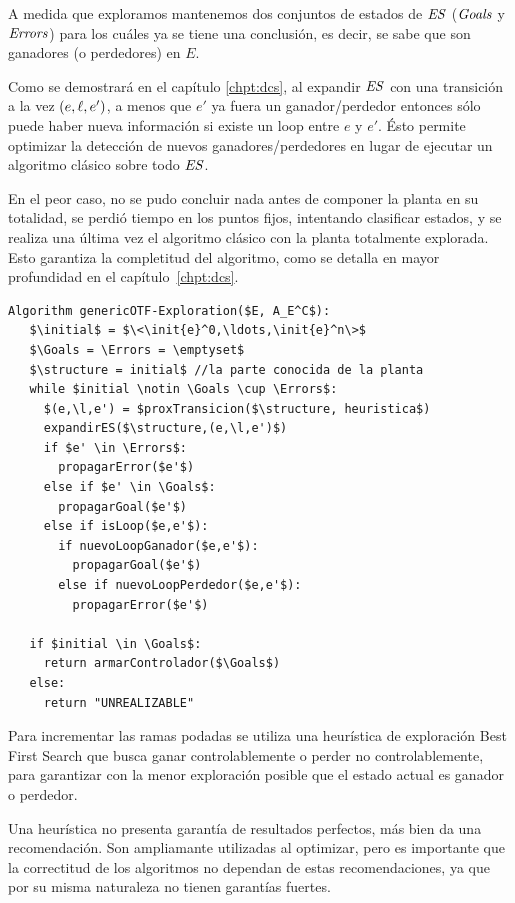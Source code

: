 A medida que exploramos mantenemos dos conjuntos de estados de $\mathit{ES}$ ($\mathit{Goals}$ y $\mathit{Errors}$) para los cuáles ya se tiene una conclusión, es decir, se sabe que son ganadores (o perdedores) en $E$.

Como se demostrará en el capítulo \ref{chpt:dcs}, al expandir $\mathit{ES}$ con una transición a la vez $(e,\ell,e')$, a menos que $e'$ ya fuera un ganador/perdedor entonces sólo puede haber nueva información si existe un loop entre $e$ y $e'$. Ésto permite optimizar la detección de nuevos ganadores/perdedores en lugar de ejecutar un algoritmo clásico sobre todo $\mathit{ES}$.

En el peor caso, no se pudo concluir nada antes de componer la planta en su totalidad, se perdió tiempo en los puntos fijos, intentando clasificar estados, y se realiza una última vez el algoritmo clásico con la planta totalmente explorada. Esto garantiza la completitud del algoritmo, como se detalla en mayor profundidad en el capítulo~\ref{chpt:dcs}.

\begin{lstlisting}[language={pseudocode},label={lst:on-the-fly},caption={Nuestro enfoque on-the-fly},float=ht]
Algorithm genericOTF-Exploration($E, A_E^C$):
   $\initial$ = $\<\init{e}^0,\ldots,\init{e}^n\>$
   $\Goals = \Errors = \emptyset$
   $\structure = initial$ //la parte conocida de la planta
   while $initial \notin \Goals \cup \Errors$:
     $(e,\l,e') = $proxTransicion($\structure, heuristica$)
     expandirES($\structure,(e,\l,e')$)
     if $e' \in \Errors$:
       propagarError($e'$)
     else if $e' \in \Goals$:
       propagarGoal($e'$)
     else if isLoop($e,e'$):
       if nuevoLoopGanador($e,e'$):
         propagarGoal($e'$)
       else if nuevoLoopPerdedor($e,e'$):
         propagarError($e'$)
         
   if $initial \in \Goals$:
     return armarControlador($\Goals$)
   else:
     return "UNREALIZABLE"  
\end{lstlisting}

Para incrementar las ramas podadas se utiliza una heurística de exploración Best First Search \cite{tesisDani} que busca ganar controlablemente o perder no controlablemente, para garantizar con la menor exploración posible que el estado actual es ganador o perdedor.

Una heurística no presenta garantía de resultados perfectos, más bien da una recomendación. Son ampliamante utilizadas al optimizar, pero es importante que la correctitud de los algoritmos no dependan de estas recomendaciones, ya que por su misma naturaleza no tienen garantías fuertes.


